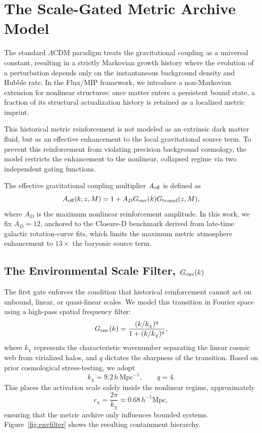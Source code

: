 \documentclass[11pt,a4paper]{article}
\newcommand{\LCDM}{$\Lambda$CDM}
\begin{document}
\section{The Scale-Gated Metric Archive Model}

The standard \LCDM{} paradigm treats the gravitational coupling as a universal constant, resulting in a strictly Markovian growth history where the evolution of a perturbation depends only on the instantaneous background density and Hubble rate. In the Flux/MIP framework, we introduce a non-Markovian extension for nonlinear structures: once matter enters a persistent bound state, a fraction of its structural actualization history is retained as a localized metric imprint.

This historical metric reinforcement is not modeled as an extrinsic dark matter fluid, but as an effective enhancement to the local gravitational source term. To prevent this reinforcement from violating precision background cosmology, the model restricts the enhancement to the nonlinear, collapsed regime via two independent gating functions.

The effective gravitational coupling multiplier $A_{\rm eff}$ is defined as
\begin{equation}
A_{\rm eff}(k,z,M)=1+A_DG_{\rm env}(k)G_{\rm bound}(z,M),
\end{equation}
where $A_D$ is the maximum nonlinear reinforcement amplitude. In this work, we fix $A_D=12$, anchored to the Closure-D benchmark derived from late-time galactic rotation-curve fits, which limits the maximum metric atmosphere enhancement to $13\times$ the baryonic source term.

\subsection{The Environmental Scale Filter, $G_{\rm env}(k)$}

The first gate enforces the condition that historical reinforcement cannot act on unbound, linear, or quasi-linear scales. We model this transition in Fourier space using a high-pass spatial frequency filter:
\begin{equation}
G_{\rm env}(k)=\frac{(k/k_\chi)^q}{1+(k/k_\chi)^q},
\end{equation}
where $k_\chi$ represents the characteristic wavenumber separating the linear cosmic web from virialized halos, and $q$ dictates the sharpness of the transition. Based on prior cosmological stress-testing, we adopt
\begin{equation}
k_\chi=9.2\,h\,\mathrm{Mpc}^{-1},\qquad q=4.
\end{equation}
This places the activation scale safely inside the nonlinear regime, approximately
\begin{equation}
r_\chi=\frac{2\pi}{k_\chi}\approx0.68\,h^{-1}\mathrm{Mpc},
\end{equation}
ensuring that the metric archive only influences bounded systems. Figure~\ref{fig:envfilter} shows the resulting containment hierarchy.
\end{document}
